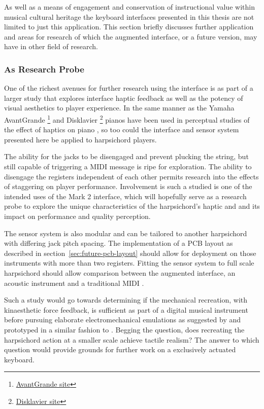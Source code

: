 As well as a means of engagement and conservation of instructional value within
musical cultural heritage the keyboard interfaces presented in this thesis are
not limited to just this application. This section briefly discusses further
application and areas for research of which the augmented interface, or a future
version, may have in other field of research.

\subsubsection{As Research Probe}

One of the richest avenues for further research using the interface is as part
of a larger study that explores interface haptic feedback as well as the potency
of visual aesthetics to player experience. In the same manner as the Yamaha
AvantGrande%
\footnote{\href{https://uk.yamaha.com/en/musical-instruments/pianos/products/avantgrand/}{AvantGrande
        site}} and Disklavier%
\footnote{\href{https://uk.yamaha.com/en/musical-instruments/pianos/products/disklavier/}{Disklavier
        site}} pianos have been used in perceptual studies of the effect of haptics on
piano \cite{fontana_perception_2018, charalampos_role_2018}, so too could the
interface and sensor system presented here be applied to harpsichord players.

The ability for the jacks to be disengaged and prevent plucking the string, but
still capable of triggering a MIDI message is ripe for exploration. The ability
to disengage the registers independent of each other permits research into the
effects of staggering on player performance. Involvement is such a studied is
one of the intended uses of the Mark 2 interface, which will hopefully serve as
a research probe to explore the unique characteristics of the harpsichord's
haptic and and its impact on performance and quality perception.

The sensor system is also modular and can be tailored to another harpsichord
with differing jack pitch spacing. The implementation of a PCB layout as
described in section~\ref{sec:future-pcb-layout} should allow for deployment on
those instruments with more than two registers. Fitting the sensor system to
full scale harpsichord should allow comparison between the augmented interface,
an acoustic instrument and a traditional MIDI \textcite{mcalpine_sampling_2014}.

Such a study would go towards determining if the mechanical recreation, with
kinaesthetic force feedback, is sufficient as part of a digital musical
instrument before pursuing elaborate electromechanical emulations as suggested
by \textcite{mcalpine_sampling_2014} and prototyped in a similar fashion to
\textcite{gillespie_virtual_1994,lozada_novel_2007,timmermans_multibody-based_2020}.
Begging the question, does recreating the harpsichord action at a smaller scale
achieve tactile realism? The answer to which question would provide grounds for
further work on a exclusively actuated keyboard.

